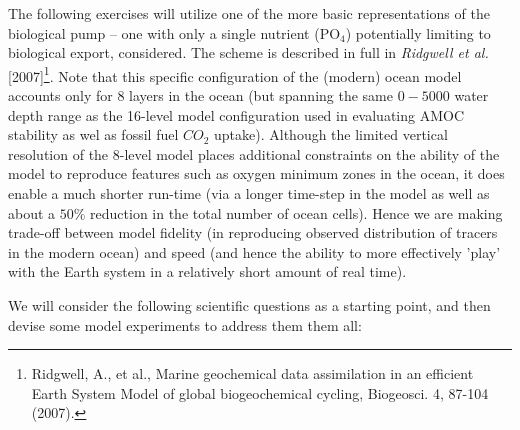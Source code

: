 The following exercises  will utilize one of the more basic representations of the biological pump -- one with only a single nutrient (PO$_{4}$) potentially limiting to biological export, considered. The scheme is described in full in \textit{Ridgwell et al.} [2007]\footnote{Ridgwell, A., et al., Marine geochemical data assimilation in an efficient Earth System Model of global biogeochemical cycling, Biogeosci. 4, 87-104 (2007). }. Note that this specific configuration of the (modern) ocean model accounts only for 8 layers in the ocean (but spanning the same \(0-5000 \) water depth range as the 16-level model configuration used in evaluating AMOC stability as wel as fossil fuel \(CO_{2}\) uptake). Although the limited vertical resolution of the 8-level model places additional constraints on the ability of the model to reproduce features such as oxygen minimum zones in the ocean, it does enable a much shorter run-time (via a longer time-step in the model as well as about a \(50\%\) reduction in the total number of ocean cells). Hence we are making  trade-off between model fidelity (in reproducing observed distribution of tracers in the modern ocean) and speed (and hence the ability to more effectively 'play' with the Earth system in a relatively short amount of real time).

\vspace{1mm}

We will consider the following scientific questions as a starting point, and then devise some model experiments to address them them all:


